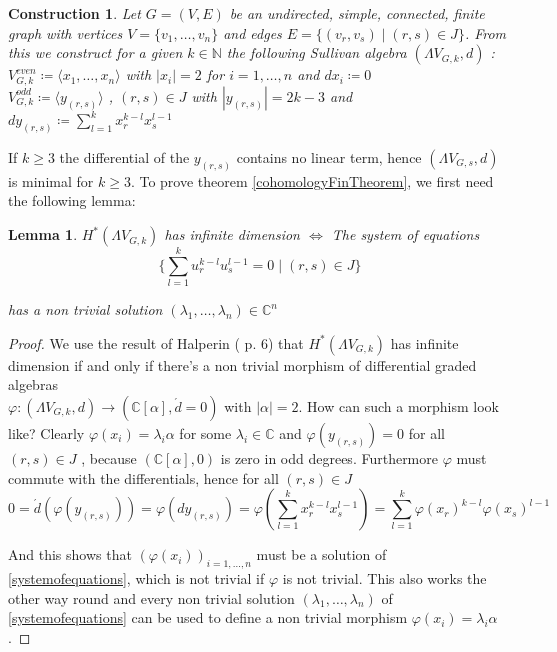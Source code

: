 \documentclass[12pt,a4paper]{scrartcl}
\newtheorem{Lemma}[Theorem]{Lemma}
\newtheorem{Construction}[Theorem]{Construction}
\numberwithin{equation}{section}
\newcommand{\C}{\mathbb{C}} %
\newcommand{\N}{\mathbb{N}} %
\begin{document}
 \begin{Construction}
 \label{constructionOfSullivanAlgebra}
 Let $G = (V,E)$ be an undirected, simple, connected, finite graph with vertices $ V = \lbrace v_1, \dotsc , v_n \rbrace $
 and edges $ E = \lbrace (v_r, v_s) \; | \; (r,s) \in J \rbrace$. From this we construct for a given $k \in \N$ the following
 Sullivan algebra $(\Lambda V_{G,k} , d)$ : \\
 
 $ V^{even}_{G,k} \coloneqq \langle x_1, \dotsc , x_n \rangle $ \; with \; $|x_i| = 2$ \; for \; $ i = 1, \dotsc , n$ \; 
 and \; $dx_i \coloneqq 0$ \\
 
 $V^{odd}_{G,k} \coloneqq \langle y_{(r,s)} \rangle$ , $(r,s) \in J$ \; with \; $|y_{(r,s)}| = 2k - 3$ \; and \; $dy_{(r,s)} \coloneqq 
 \sum_{l = 1}^k x_r^{k -l} x_s^{l - 1}$ \\
 
 \end{Construction}

  If $k \geq 3$ the differential of the $y_{(r,s)}$ contains no linear term, hence
  $(\Lambda V_{G,s} ,d)$ is minimal for $k \geq 3$. To prove theorem \ref{cohomologyFinTheorem}, we first need the following lemma:
  
  
\begin{Lemma}
\label{lma:cohomoly+equations}
 $H^*(\Lambda V_{G,k})$ has infinite dimension $\iff$ The system of equations \\
 \begin{equation}
 \label{systemofequations}
 {\lbrace \sum_{l = 1}^k u_r^{k - l} u_s^{l - 1} = 0 \; | \; (r,s) \in J \rbrace}  
 \end{equation}
 
 has a non trivial solution 
 $(\lambda_1 , \dotsc, \lambda_n) \in \C^n$
\end{Lemma}

\begin{proof}
 We use the result of Halperin (\cite{Halperin1988} p. 6) that $H^*(\Lambda V_{G,k})$ has infinite dimension if and only if %
 there's a non trivial morphism of differential graded algebras \\
 ${\varphi \colon (\Lambda V_{G,k},d) \to ( \C [\alpha] ,\acute{d} = 0)}$ with $|\alpha| = 2$. How can such a morphism look like?
 Clearly $\varphi(x_i) = \lambda_i \alpha$ for some $\lambda_i \in \C$ and $\varphi(y_{(r,s)}) = 0$ for all $(r,s) \in J$ , because 
 $(\C [\alpha] , 0)$ is zero in odd degrees. Furthermore $\varphi$ must commute with the differentials, hence 
 for all $(r,s) \in J$
 $$ 0 = \acute{d} (\varphi(y_{(r,s)})) = \varphi(dy_{(r,s)}) = \varphi(\sum_{l = 1}^k x_r^{k -l} x_s^{l - 1})
 = \sum_{l = 1}^k \varphi(x_r)^{k -l} \varphi(x_s)^{l - 1}$$
 
 And this shows that $(\varphi(x_i))_{i = 1, \dotsc , n}$ must be a solution of \ref{systemofequations}, which is not trivial
 if $\varphi$ is not trivial.
 This also works the other way round and every non trivial solution  $(\lambda_1 , \dotsc, \lambda_n)$ of \ref{systemofequations}
 can be used to define a non trivial morphism $\varphi(x_i) = \lambda_i \alpha$.
 \end{proof}
\end{document}
